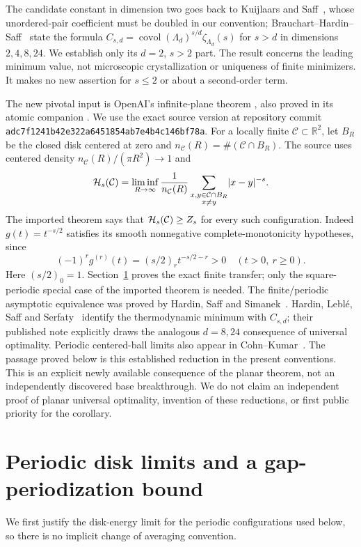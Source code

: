 \documentclass[11pt]{article}
\newcommand{\R}{\mathbb R}\newcommand{\Z}{\mathbb Z}
\newcommand{\abs}[1]{\lvert#1\rvert}\newcommand{\norm}[1]{\lVert#1\rVert}
\DeclareMathOperator{\covol}{covol}
\begin{document}
The candidate constant in dimension two goes back to Kuijlaars and
Saff~\cite[Conjecture 1]{KS1998}, whose unordered-pair coefficient must be
doubled in our convention; Brauchart--Hardin--Saff~\cite[Conjecture 2]{BHS2012}
state the formula $C_{s,d}=\covol(\Lambda_d)^{s/d}\zeta_{\Lambda_d}(s)$
for $s>d$ in dimensions $2,4,8,24$. We establish only its $d=2$, $s>2$
part. The result concerns the leading minimum value, not microscopic
crystallization or uniqueness of finite minimizers. It makes no new assertion
for $s\le2$ or about a second-order term.

The new pivotal input is OpenAI's infinite-plane theorem
\cite[Theorem 1.1]{OAIUniversal}, also proved in its atomic companion
\cite[Theorem 1.1]{OAIAtomic}. We use the exact source version at repository
commit \texttt{adc7f1241b42e322a6451854ab7e4b4c146bf78a}.
For a locally finite $\mathcal C\subset\R^2$, let $B_R$ be the closed disk
centered at zero and $n_{\mathcal C}(R)=\#(\mathcal C\cap B_R)$. The source
uses centered density $n_{\mathcal C}(R)/(\pi R^2)\to1$ and
\begin{equation}\label{eq:infinite}
 \Hs(\mathcal C)=\liminf_{R\to\infty}\frac1{n_{\mathcal C}(R)}
   \sum_{\substack{x,y\in\mathcal C\cap B_R\\x\ne y}}\abs{x-y}^{-s}.
\end{equation}
The imported theorem says that $\mathcal H_s(\mathcal C)\ge Z_s$ for every such
configuration. Indeed $g(t)=t^{-s/2}$ satisfies its smooth nonnegative
complete-monotonicity hypotheses, since
\[
 (-1)^r g^{(r)}(t)=(s/2)_r t^{-s/2-r}>0\quad(t>0,\ r\ge0).
\]
Here $(s/2)_0=1$. Section~\ref{sec:periodic} proves the exact finite transfer;
only the square-periodic special case of the imported theorem is needed.
The finite/periodic asymptotic equivalence was proved by Hardin, Saff and
Simanek~\cite[Theorem 3.2]{HSS2014}. Hardin, Lebl\'e, Saff and
Serfaty~\cite[Proposition 3.1]{HLSS2018} identify the thermodynamic minimum
with $C_{s,d}$; their published note explicitly draws the analogous
$d=8,24$ consequence of universal optimality. Periodic centered-ball
limits also appear in Cohn--Kumar~\cite[Lemma 9.1]{CK2007}. The passage
proved below is this established reduction in the present conventions.
This is an explicit newly available consequence of the planar theorem,
not an independently discovered base breakthrough. We do not claim an
independent proof of planar universal optimality, invention of these
reductions, or first public priority for the corollary.

\section{Periodic disk limits and a gap-periodization bound}\label{sec:periodic}
We first justify the disk-energy limit for the periodic configurations used
below, so there is no implicit change of averaging convention.
\end{document}
